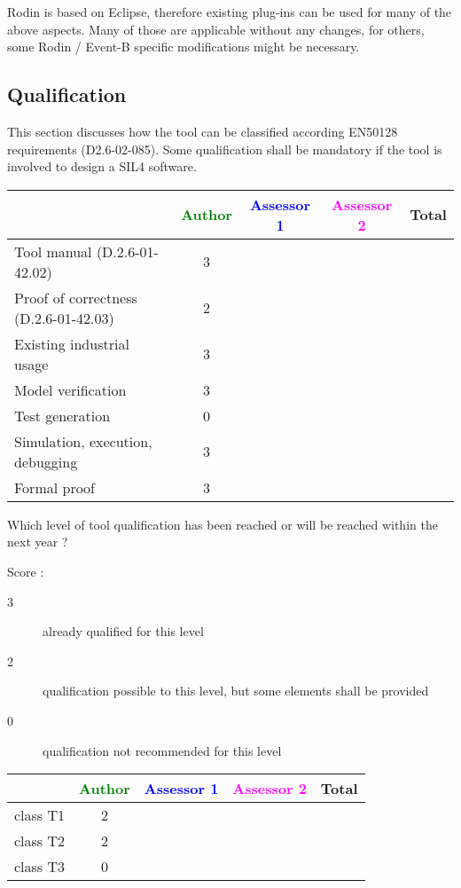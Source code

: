 \begin{author_comment}
  Rodin is based on Eclipse, therefore existing plug-ins can be used for many of
  the above aspects. Many of those are applicable without any changes, for
  others, some Rodin / Event-B specific modifications might be necessary.
\end{author_comment}

\subsection{Qualification}

This section discusses how the tool can be classified according EN50128 requirements (D2.6-02-085). Some qualification shall be mandatory  if the tool is involved to design a SIL4 software.


\begin{tabular}{|l | c | c | c | c|}
\hline
& \textcolor{green}{Author} & \textcolor{blue}{Assessor 1} & \textcolor{magenta}{Assessor 2} & Total \\
\hline
Tool manual (D.2.6-01-42.02) & 3 & & &  \\
\hline
Proof of correctness (D.2.6-01-42.03)   & 2 & & & \\
\hline
Existing industrial  usage  & 3 & & & \\
\hline
Model verification & 3 & & & \\
\hline
Test generation & 0 & & & \\
\hline
Simulation, execution, debugging & 3 & & & \\
\hline
Formal proof & 3 & & & \\
\hline
\end{tabular}


Which level of tool qualification has been reached or will be reached within the next year ?


Score :
\begin{description}
\item[3] already qualified for this level
\item[2] qualification possible to this level, but some elements shall be provided
\item[0] qualification not recommended for this level
\end{description}


\begin{tabular}{|l | c | c | c | c|}
\hline
& \textcolor{green}{Author} & \textcolor{blue}{Assessor 1} & \textcolor{magenta}{Assessor 2} & Total \\
\hline
class T1 & 2 & & &  \\
\hline
class T2  & 2 & & & \\
\hline
class T3  & 0 & & & \\
\hline
\end{tabular}

